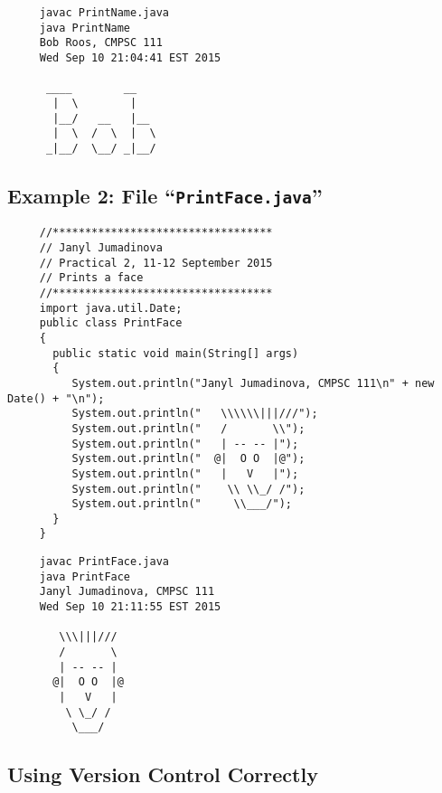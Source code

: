 \begin{verbatim}
     javac PrintName.java
     java PrintName
     Bob Roos, CMPSC 111
     Wed Sep 10 21:04:41 EST 2015

      ____        __
       |  \        |
       |__/   __   |__
       |  \  /  \  |  \
      _|__/  \__/ _|__/
\end{verbatim}

\newpage

\subsection*{Example 2: File ``{\tt PrintFace.java}''}
\begin{verbatim}
     //**********************************
     // Janyl Jumadinova
     // Practical 2, 11-12 September 2015
     // Prints a face
     //**********************************
     import java.util.Date;
     public class PrintFace
     {
       public static void main(String[] args)
       {
          System.out.println("Janyl Jumadinova, CMPSC 111\n" + new Date() + "\n");
          System.out.println("   \\\\\\|||///");
          System.out.println("   /       \\");
          System.out.println("   | -- -- |");
          System.out.println("  @|  O O  |@");
          System.out.println("   |   V   |");
          System.out.println("    \\ \\_/ /");
          System.out.println("     \\___/");
       }
     }
\end{verbatim}
\begin{verbatim}
     javac PrintFace.java
     java PrintFace
     Janyl Jumadinova, CMPSC 111
     Wed Sep 10 21:11:55 EST 2015

        \\\|||///
        /       \
        | -- -- |
       @|  O O  |@
        |   V   |
         \ \_/ /
          \___/
\end{verbatim}

\subsection*{Using Version Control Correctly}

